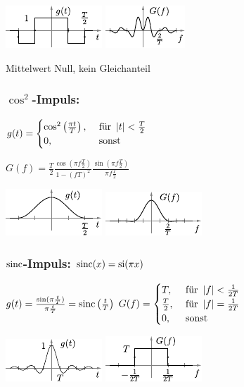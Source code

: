 \documentclass[fs, footer]{latex4ei}
\begin{document}
\begin{multicols*}{4}
{		\includegraphics{./img/FT/manchester_t.pdf} \hfill\includegraphics{./img/FT/manchester_f.pdf}

		Mittelwert Null, kein Gleichanteil
		\subsubsection{$\cos^2$-Impuls:} 
		$g(t) = \begin{cases}
			\cos^2\left(\frac{\pi t}{T}\right), &\text{ für } \left\vert t\right\vert < \frac{T}{2}\\
			0, & \text{ sonst }
		\end{cases} $
		

		$G(f) = \frac{T}{2} \frac{\cos(\pi f \frac{T}{2})}{1 - (fT)^2} \frac{\sin (\pi f \frac T 2)}{\pi f \frac T 2}$

		\includegraphics{./img/FT/cos2_t.pdf} \hfill \includegraphics{./img/FT/cos2_f.pdf}

		\subsubsection{$\operatorname{sinc}$-Impuls: $\operatorname{sinc}(x) = {\rm si}(\pi x)$}
		$g(t) = \frac{\sin (\pi \frac t T)}{\pi \frac t  T} = \operatorname{sinc}\left(\frac{t}{T}\right)$ \hfill
		$G(f) = \begin{cases}
			T, &\text{ für } \left\vert f\right\vert < \frac{1}{2T}\\
			\frac T 2 , &\text{ für } \left\vert f\right\vert = \frac{1}{2T}\\
			0, &\text{ sonst } \\
		\end{cases}$

		\includegraphics{./img/FT/sinc_t.pdf} \hfill \includegraphics{./img/FT/sinc_f.pdf}
}
\end{multicols*}
\end{document}

